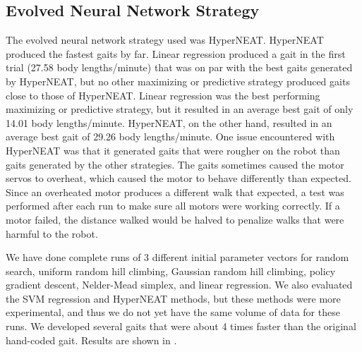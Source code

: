 \subsection{Evolved Neural Network Strategy}

The evolved neural network strategy used was HyperNEAT. HyperNEAT
produced the fastest gaits by far. Linear regression produced a gait
in the first trial (27.58 body lengths/minute) that was on par with
the best gaits generated by HyperNEAT, but no other maximizing or
predictive strategy produced gaits close to those of HyperNEAT. Linear
regression was the best performing maximizing or predictive strategy,
but it resulted in an average best gait of only 14.01 body
lengths/minute. HyperNEAT, on the other hand, resulted in an average
best gait of 29.26 body lengths/minute. One issue encountered with
HyperNEAT was that it generated gaits that were rougher on the robot
than gaits generated by the other strategies. The gaits sometimes
caused the motor servos to overheat, which caused the motor to behave
differently than expected. Since an overheated motor produces a
different walk that expected, a test was performed after each run to
make sure all motors were working correctly. If a motor failed, the
distance walked would be halved to penalize walks that were harmful to
the robot.


We have done complete runs of 3 different initial parameter vectors
for random search, uniform random hill climbing, Gaussian random hill
climbing, policy gradient descent, Nelder-Mead simplex, and linear
regression.  We also evaluated the SVM regression and HyperNEAT
methods, but these methods were more experimental, and thus we do not
yet have the same volume of data for these runs.  We developed several
gaits that were about 4 times faster than the original hand-coded
gait.  Results are shown in .



